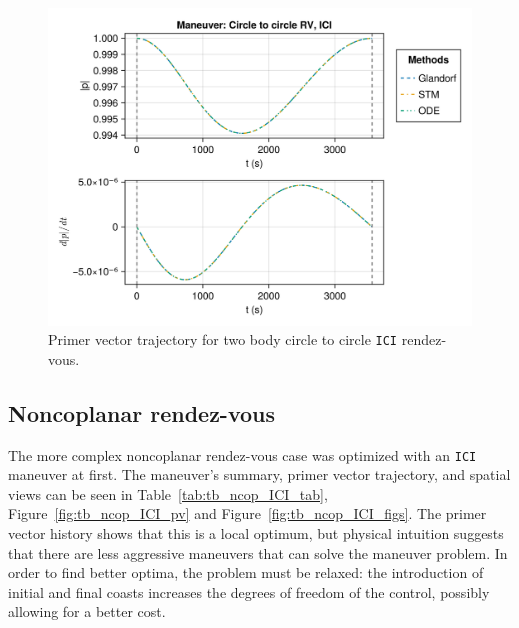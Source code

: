 \begin{figure}[htbp]
    \centering
    \includegraphics[width=\linewidth]{../results/two_body/hohmann/ICI_primer_vector.png}
    \caption{Primer vector trajectory for two body circle to circle \texttt{ICI} rendez-vous.}
    \label{fig:tb_c2c_ICI_pv}
\end{figure}

\subsection{Noncoplanar rendez-vous}

The more complex noncoplanar rendez-vous case was optimized with an \texttt{ICI} maneuver at first. The maneuver's summary, primer vector trajectory, and spatial views can be seen in Table~\ref{tab:tb_ncop_ICI_tab}, Figure~\ref{fig:tb_ncop_ICI_pv} and Figure~\ref{fig:tb_ncop_ICI_figs}. The primer vector history shows that this is a local optimum, but physical intuition suggests that there are less aggressive maneuvers that can solve the maneuver problem. In order to find better optima, the problem must be relaxed: the introduction of initial and final coasts increases the degrees of freedom of the control, possibly allowing for a better cost.


